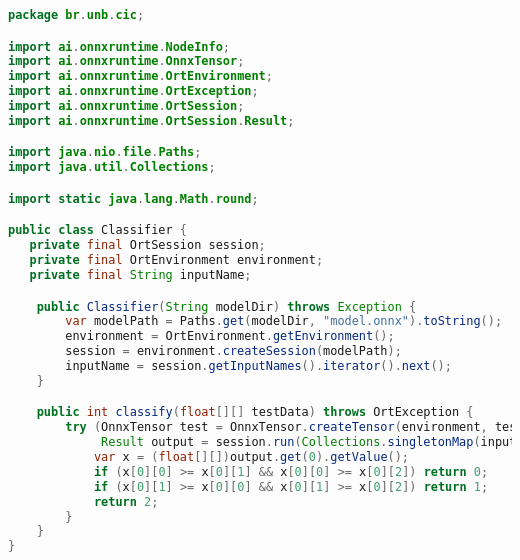 \begin{lstlisting}[language=Java, caption=Classificador implementado em Java utilizando ONNX Runtime sem GPU]
package br.unb.cic;

import ai.onnxruntime.NodeInfo;
import ai.onnxruntime.OnnxTensor;
import ai.onnxruntime.OrtEnvironment;
import ai.onnxruntime.OrtException;
import ai.onnxruntime.OrtSession;
import ai.onnxruntime.OrtSession.Result;

import java.nio.file.Paths;
import java.util.Collections;

import static java.lang.Math.round;

public class Classifier {
   private final OrtSession session;
   private final OrtEnvironment environment;
   private final String inputName;

    public Classifier(String modelDir) throws Exception {
        var modelPath = Paths.get(modelDir, "model.onnx").toString();
        environment = OrtEnvironment.getEnvironment();
        session = environment.createSession(modelPath);
        inputName = session.getInputNames().iterator().next();
    }

    public int classify(float[][] testData) throws OrtException {
        try (OnnxTensor test = OnnxTensor.createTensor(environment, testData);
             Result output = session.run(Collections.singletonMap(inputName, test))) {
            var x = (float[][])output.get(0).getValue();
            if (x[0][0] >= x[0][1] && x[0][0] >= x[0][2]) return 0;
            if (x[0][1] >= x[0][0] && x[0][1] >= x[0][2]) return 1;
            return 2;
        }
    }
}
\end{lstlisting}


